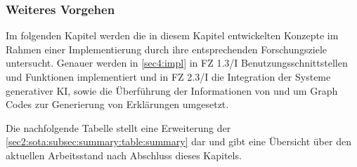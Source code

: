 \FloatBarrier

\subsubsection{Weiteres Vorgehen}
\label{sec3:model:subsubsec:futher-approach}
Im folgenden Kapitel werden die in diesem Kapitel entwickelten Konzepte im Rahmen einer Implementierung durch ihre entsprechenden Forschungsziele untersucht.
Genauer werden in \cref{sec4:impl} in FZ 1.3/I Benutzungsschnittstellen und Funktionen implementiert und in FZ 2.3/I die Integration der Systeme generativer KI, sowie die Überführung der Informationen von und um Graph Codes zur Generierung von Erklärungen umgesetzt.

Die nachfolgende Tabelle stellt eine Erweiterung der \cref{sec2:sota:subsec:summary:table:summary} dar und gibt eine Übersicht über den aktuellen Arbeitsstand nach Abschluss dieses Kapitels.


